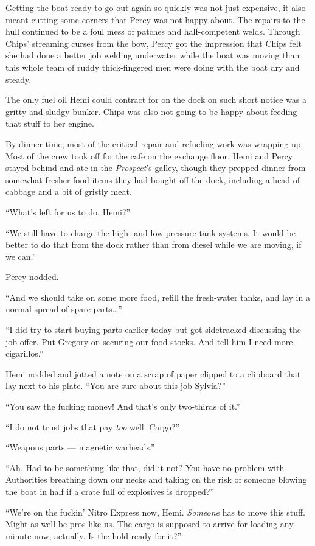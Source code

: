 \documentclass[
]{scrbook}
\begin{document}
Getting the boat ready to go out again so quickly was not just
expensive, it also meant cutting some corners that Percy was not happy
about. The repairs to the hull continued to be a foul mess of patches
and half-competent welds. Through Chips' streaming curses from the bow,
Percy got the impression that Chips felt she had done a better job
welding underwater while the boat was moving than this whole team of
ruddy thick-fingered men were doing with the boat dry and steady.

The only fuel oil Hemi could contract for on the dock on such short
notice was a gritty and sludgy bunker. Chips was also not going to be
happy about feeding that stuff to her engine.

By dinner time, most of the critical repair and refueling work was
wrapping up. Most of the crew took off for the cafe on the exchange
floor. Hemi and Percy stayed behind and ate in the \emph{Prospect}'s
galley, though they prepped dinner from somewhat fresher food items they
had bought off the dock, including a head of cabbage and a bit of
gristly meat.

``What's left for us to do, Hemi?''

``We still have to charge the high- and low-pressure tank systems. It
would be better to do that from the dock rather than from diesel while
we are moving, if we can.''

Percy nodded.

``And we should take on some more food, refill the fresh-water tanks,
and lay in a normal spread of spare parts\ldots{}''

``I did try to start buying parts earlier today but got sidetracked
discussing the job offer. Put Gregory on securing our food stocks. And
tell him I need more cigarillos.''

Hemi nodded and jotted a note on a scrap of paper clipped to a clipboard
that lay next to his plate. ``You are sure about this job Sylvia?''

``You saw the fucking money! And that's only two-thirds of it.''

``I do not trust jobs that pay \emph{too} well. Cargo?''

``Weapons parts --- magnetic warheads.''

``Ah. Had to be something like that, did it not? You have no problem
with Authorities breathing down our necks and taking on the risk of
someone blowing the boat in half if a crate full of explosives is
dropped?''

``We're on the fuckin' Nitro Express now, Hemi. \emph{Someone} has to
move this stuff. Might as well be pros like us. The cargo is supposed to
arrive for loading any minute now, actually. Is the hold ready for it?''
\end{document}
